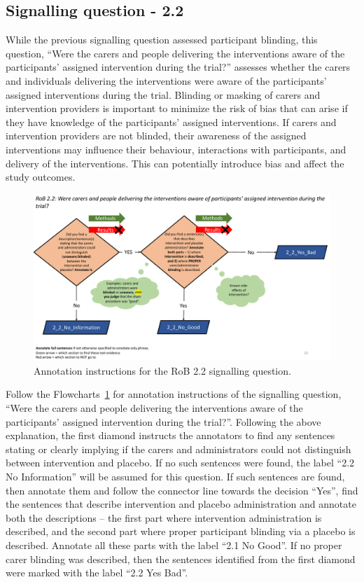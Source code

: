 \documentclass[sn-mathphys,Numbered]{sn-jnl}%
\begin{document}
\subsection*{Signalling question - 2.2}
\label{subsec:2_2}
%
While the previous signalling question assessed participant blinding, this question, ``Were the carers and people delivering the interventions aware of the participants' assigned intervention during the trial?'' assesses whether the carers and individuals delivering the interventions were aware of the participants' assigned interventions during the trial.
Blinding or masking of carers and intervention providers is important to minimize the risk of bias that can arise if they have knowledge of the participants' assigned interventions.
If carers and intervention providers are not blinded, their awareness of the assigned interventions may influence their behaviour, interactions with participants, and delivery of the interventions.
This can potentially introduce bias and affect the study outcomes.

%
\begin{figure}[hbt]
    \centering
    \includegraphics[width=\textwidth]{figures/2_2.pdf}
    \caption{Annotation instructions for the RoB 2.2 signalling question.}
    \label{fig:2_2}
\end{figure}
%
Follow the Flowcharts~\ref{fig:2_2} for annotation instructions of the signalling question, ``Were the carers and people delivering the interventions aware of the participants' assigned intervention during the trial?''.
Following the above explanation, the first diamond instructs the annotators to find any sentences stating or clearly implying if the carers and administrators could not distinguish between intervention and placebo.
If no such sentences were found, the label ``2.2 No Information'' will be assumed for this question.
If such sentences are found, then annotate them and follow the connector line towards the decision ``Yes'', find the sentences that describe intervention and placebo administration and annotate both the descriptions – the first part where intervention administration is described, and the second part where proper participant blinding via a placebo is described.
Annotate all these parts with the label ``2.1 No Good''.
If no proper carer blinding was described, then the sentences identified from the first diamond were marked with the label ``2.2 Yes Bad''.
%
%
%
\end{document}
